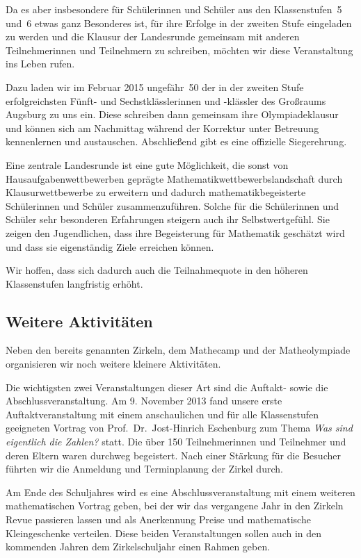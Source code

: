 \documentclass[12pt]{zettel}
\begin{document}
Da es aber insbesondere für Schülerinnen und Schüler aus den Klassenstufen~5
und~6 etwas ganz Besonderes ist, für ihre Erfolge in der zweiten Stufe
eingeladen zu werden und die Klausur der Landesrunde gemeinsam mit anderen
Teilnehmerinnen und Teilnehmern zu schreiben, möchten wir diese Veranstaltung
ins Leben rufen.

Dazu laden wir im Februar 2015 ungefähr~50 der in der zweiten Stufe
erfolgreichsten Fünft- und Sechstklässlerinnen und -klässler des Großraums
Augsburg zu uns ein. Diese schreiben dann gemeinsam ihre Olympiadeklausur und
können sich am Nachmittag während der Korrektur unter Betreuung kennenlernen
und austauschen. Abschließend gibt es eine offizielle Siegerehrung.

Eine zentrale Landesrunde ist eine gute Möglichkeit, die sonst von
Hausaufgabenwettbewerben geprägte Mathematikwettbewerbslandschaft durch
Klausurwettbewerbe zu erweitern und dadurch mathematikbegeisterte Schülerinnen
und Schüler zusammenzuführen. Solche für die Schülerinnen und Schüler
sehr besonderen Erfahrungen steigern auch ihr Selbstwertgefühl. Sie zeigen
den Jugendlichen, dass ihre Begeisterung für Mathematik geschätzt wird und dass sie eigenständig Ziele erreichen können.

Wir hoffen, dass sich dadurch auch die Teilnahmequote
in den höheren Klassenstufen langfristig erhöht.


\subsection{Weitere Aktivitäten}

Neben den bereits genannten Zirkeln, dem Mathecamp und der
Matheolympiade organisieren wir noch weitere kleinere
Aktivitäten.

Die wichtigsten zwei Veranstaltungen dieser Art sind die Auftakt- sowie die
Abschlussveranstaltung. Am 9. November 2013 fand unsere erste
Auftaktveranstaltung mit einem anschaulichen und für alle Klassenstufen
geeigneten Vortrag von
Prof.~Dr.~Jost-Hinrich Eschenburg zum Thema \emph{Was sind eigentlich die
Zahlen?} statt.
Die über 150 Teilnehmerinnen und Teilnehmer und deren Eltern waren durchweg
begeistert. Nach einer Stärkung für die Besucher führten wir
die Anmeldung und Terminplanung der Zirkel durch.

Am Ende des Schuljahres wird es eine Abschlussveranstaltung mit einem
weiteren mathematischen Vortrag geben, bei der wir
das vergangene Jahr in den Zirkeln Revue passieren lassen und als Anerkennung
Preise und mathematische Kleingeschenke verteilen. Diese beiden Veranstaltungen sollen
auch in den kommenden Jahren dem Zirkelschuljahr einen Rahmen geben.
\end{document}
